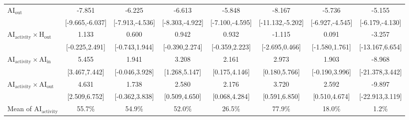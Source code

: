\begin{table}[H]
\begin{threeparttable}
\begin{tabular}{l*{7}{c}}
$\mathrm{AI_{out}}$&                -7.851\sym{***}&                -6.225\sym{***}&                -6.613\sym{***}&                -5.848\sym{***}&                -8.167\sym{***}&                -5.736\sym{***}&                -5.155\sym{***}\\
            &       [-9.665,-6.037]         &       [-7.913,-4.536]         &       [-8.303,-4.922]         &       [-7.100,-4.595]         &      [-11.132,-5.202]         &       [-6.927,-4.545]         &       [-6.179,-4.130]         \\
\addlinespace
$\mathrm{AI_{activity}} \times \mathrm{H_{out}}$&                 1.133         &                 0.600         &                 0.942         &                 0.932         &                -1.115         &                 0.091         &                -3.257         \\
            &        [-0.225,2.491]         &        [-0.743,1.944]         &        [-0.390,2.274]         &        [-0.359,2.223]         &        [-2.695,0.466]         &        [-1.580,1.761]         &       [-13.167,6.654]         \\
\addlinespace
$\mathrm{AI_{activity}} \times \mathrm{AI_{in}}$&                 5.455\sym{***}&                 1.941         &                 3.208\sym{**} &                 2.161\sym{*}  &                 2.973\sym{*}  &                 1.903         &                -8.968         \\
            &         [3.467,7.442]         &        [-0.046,3.928]         &         [1.268,5.147]         &         [0.175,4.146]         &         [0.180,5.766]         &        [-0.190,3.996]         &       [-21.378,3.442]         \\
\addlinespace
$\mathrm{AI_{activity}} \times \mathrm{AI_{out}}$&                 4.631\sym{***}&                 1.738         &                 2.580\sym{*}  &                 2.176\sym{*}  &                 3.720\sym{*}  &                 2.592\sym{*}  &                -9.897         \\
            &         [2.509,6.752]         &        [-0.362,3.838]         &         [0.509,4.650]         &         [0.068,4.284]         &         [0.591,6.850]         &         [0.510,4.674]         &       [-22.913,3.119]         \\
\midrule
Mean of $\mathrm{AI_{activity}}$&                55.7\%         &                54.9\%         &                52.0\%         &                26.5\%         &                77.9\%         &                18.0\%         &                 1.2\%         \\

\end{tabular}
\end{threeparttable}
\end{table}
